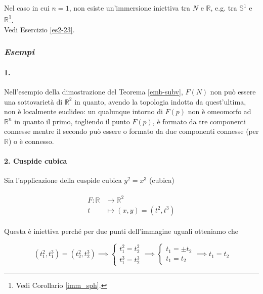 Nel caso in cui $ n=1 $, non esiste un'immersione iniettiva tra $ N $ e $ \mathbb{R} $, e.g. tra $ \mathbb{S}^{1} $ e $ \mathbb{R} $\footnote{%
	Vedi Corollario \ref{imm_sph}.%
}.\\
Vedi Esercizio \ref{es2-23}.

\subsubsection{\textit{Esempi}}

\paragraph{1.}

Nell'esempio della dimostrazione del Teorema \ref{emb-subv}, $ F(N) $ non può essere una sottovarietà di $ \mathbb{R}^{2} $ in quanto, avendo la topologia indotta da quest'ultima, non è localmente euclideo: un qualunque intorno di $ F(p) $ non è omeomorfo ad $ \mathbb{R}^{n} $ in quanto il primo, togliendo il punto $ F(p) $, è formato da tre componenti connesse mentre il secondo può essere o formato da due componenti connesse (per $ \mathbb{R} $) o è connesso.

\paragraph{2. Cuspide cubica}

Sia l'applicazione della cuspide cubica $ y^{2} = x^{3} $ (cubica)

\begin{align}
	\begin{split}
		F : \mathbb{R} &\to \mathbb{R}^{2}\\
		t &\mapsto (x,y) = (t^{2},t^{3})
	\end{split}
\end{align}

Questa è iniettiva perché per due punti dell'immagine uguali otteniamo che

\begin{equation}
	(t_{1}^{2},t_{1}^{3}) = (t_{2}^{2},t_{2}^{3})%
	\implies%
	\begin{cases}
		t_{1}^{2} = t_{2}^{2}\\
		t_{1}^{3} = t_{2}^{3}
	\end{cases}%
	\implies%
	\begin{cases}
		t_{1} = \pm t_{2}\\
		t_{1} = t_{2}
	\end{cases}%
	\implies%
	t_{1} = t_{2}
\end{equation}

